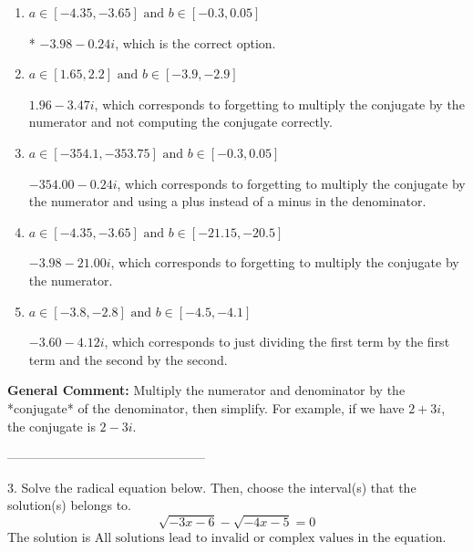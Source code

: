 \documentclass{extbook}[14pt]
\begin{document}
\begin{enumerate}[label=\Alph*.] 
\item $ a \in [-4.35, -3.65] \text{ and } b \in [-0.3, 0.05] $ 

 * $-3.98  - 0.24 i$, which is the correct option. 
\item $ a \in [1.65, 2.2] \text{ and } b \in [-3.9, -2.9] $ 

  $1.96  - 3.47 i$, which corresponds to forgetting to multiply the conjugate by the numerator and not computing the conjugate correctly. 
\item $ a \in [-354.1, -353.75] \text{ and } b \in [-0.3, 0.05] $ 

  $-354.00  - 0.24 i$, which corresponds to forgetting to multiply the conjugate by the numerator and using a plus instead of a minus in the denominator. 
\item $ a \in [-4.35, -3.65] \text{ and } b \in [-21.15, -20.5] $ 

  $-3.98  - 21.00 i$, which corresponds to forgetting to multiply the conjugate by the numerator. 
\item $ a \in [-3.8, -2.8] \text{ and } b \in [-4.5, -4.1] $ 

  $-3.60  - 4.12 i$, which corresponds to just dividing the first term by the first term and the second by the second. 
\end{enumerate} 
 
\textbf{General Comment:} Multiply the numerator and denominator by the *conjugate* of the denominator, then simplify. For example, if we have $2+3i$, the conjugate is $2-3i$. 

-----------------------------------------------

3. Solve the radical equation below. Then, choose the interval(s) that the solution(s) belongs to.
\[ \sqrt{-3 x - 6} - \sqrt{-4 x - 5} = 0 \] 
The solution is $ \text{All solutions lead to invalid or complex values in the equation.} $ 
\end{document}
